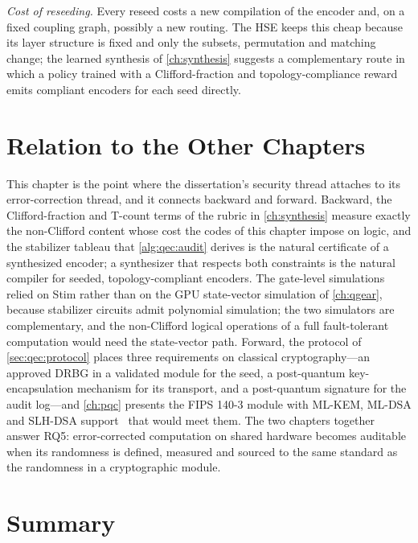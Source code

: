 \emph{Cost of reseeding.} Every reseed costs a new compilation of the encoder and, on a fixed coupling graph, possibly a new routing. The HSE keeps this cheap because its layer structure is fixed and only the subsets, permutation and matching change; the learned synthesis of \cref{ch:synthesis} suggests a complementary route in which a policy trained with a Clifford-fraction and topology-compliance reward emits compliant encoders for each seed directly.

\section{Relation to the Other Chapters}\label{sec:qec:relation}

This chapter is the point where the dissertation's security thread attaches to its error-correction thread, and it connects backward and forward. Backward, the Clifford-fraction and T-count terms of the \rubriq{} rubric in \cref{ch:synthesis} measure exactly the non-Clifford content whose cost the codes of this chapter impose on logic, and the stabilizer tableau that \cref{alg:qec:audit} derives is the natural certificate of a synthesized encoder; a synthesizer that respects both constraints is the natural compiler for seeded, topology-compliant encoders. The gate-level simulations relied on Stim rather than on the GPU state-vector simulation of \cref{ch:qgear}, because stabilizer circuits admit polynomial simulation; the two simulators are complementary, and the non-Clifford logical operations of a full fault-tolerant computation would need the state-vector path. Forward, the protocol of \cref{sec:qec:protocol} places three requirements on classical cryptography---an approved DRBG in a validated module for the seed, a post-quantum key-encapsulation mechanism for its transport, and a post-quantum signature for the audit log---and \cref{ch:pqc} presents the FIPS 140-3 module with ML-KEM, ML-DSA and SLH-DSA support~\cite{guo2026lightriderqpc} that would meet them. The two chapters together answer RQ5: error-corrected computation on shared hardware becomes auditable when its randomness is defined, measured and sourced to the same standard as the randomness in a cryptographic module.

\section{Summary}\label{sec:qec:summary}

